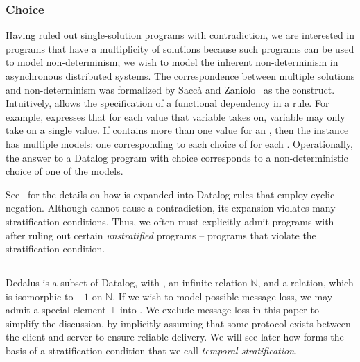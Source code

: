 \subsubsection{Choice}

Having ruled out single-solution programs with contradiction, we are interested
in programs that have a multiplicity of solutions because such programs can be
used to model non-determinism; we wish to model the inherent non-determinism in
asynchronous distributed systems.  The correspondence between multiple
solutions and non-determinism was formalized by Sacc\`{a} and
Zaniolo~\cite{sacca-zaniolo} as the  construct.  Intuitively,
 allows the specification of a functional dependency in a rule.
For example,  expresses that for
each value that variable  takes on, variable  may only
take on a single value.  If  contains more than one 
value for an , then the instance has multiple models: one
corresponding to each choice of  for each .
Operationally, the answer to a Datalog program with choice corresponds to a
non-deterministic choice of one of the models.

See~\cite{sacca-zaniolo} for the details on how  is expanded
into Datalog rules that employ cyclic negation.  Although 
cannot cause a contradiction, its expansion violates many stratification
conditions.  Thus, we often must explicitly admit programs with
 after ruling out certain {\em unstratified} programs --
programs that violate the stratification condition.

\subsection{\lang}

Dedalus is a subset of Datalog, with , an infinite
 relation $\mathbb{N}$, and a 
relation, which is isomorphic to $+1$ on $\mathbb{N}$.  If we wish to model
possible message loss, we may admit a special element $\top$ into
.  We exclude message loss in this paper to simplify the
discussion, by implicitly assuming that some protocol exists between the client
and server to ensure reliable delivery.  
We will see later how  forms the basis of a stratification
condition that we call {\em temporal stratification}.

